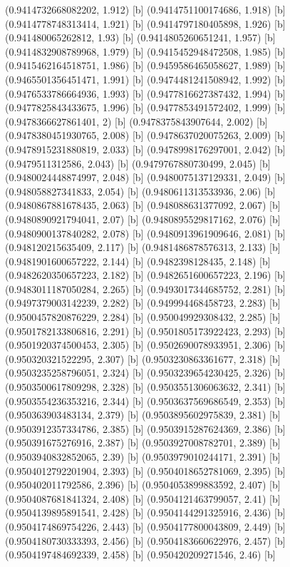 {{{(0.9414732668082202, 1.912) [b] 
(0.9414751100174686, 1.918) [b] 
(0.9414778748313414, 1.921) [b] 
(0.9414797180405898, 1.926) [b] 
(0.941480065262812, 1.93) [b] 
(0.9414805260651241, 1.957) [b] 
(0.9414832908789968, 1.979) [b] 
(0.9415452948472508, 1.985) [b] 
(0.9415462164518751, 1.986) [b] 
(0.9459586465058627, 1.989) [b] 
(0.9465501356451471, 1.991) [b] 
(0.9474481241508942, 1.992) [b] 
(0.9476533786664936, 1.993) [b] 
(0.9477816627387432, 1.994) [b] 
(0.9477825843433675, 1.996) [b] 
(0.9477853491572402, 1.999) [b] 
(0.9478366627861401, 2) [b] 
(0.9478375843907644, 2.002) [b] 
(0.9478380451930765, 2.008) [b] 
(0.9478637020075263, 2.009) [b] 
(0.9478915231880819, 2.033) [b] 
(0.9478998176297001, 2.042) [b] 
(0.9479511312586, 2.043) [b] 
(0.9479767880730499, 2.045) [b] 
(0.9480024448874997, 2.048) [b] 
(0.9480075137129331, 2.049) [b] 
(0.948058827341833, 2.054) [b] 
(0.9480611313533936, 2.06) [b] 
(0.9480867881678435, 2.063) [b] 
(0.948088631377092, 2.067) [b] 
(0.9480890921794041, 2.07) [b] 
(0.9480895529817162, 2.076) [b] 
(0.9480900137840282, 2.078) [b] 
(0.9480913961909646, 2.081) [b] 
(0.948120215635409, 2.117) [b] 
(0.9481486878576313, 2.133) [b] 
(0.9481901600657222, 2.144) [b] 
(0.9482398128435, 2.148) [b] 
(0.9482620350657223, 2.182) [b] 
(0.9482651600657223, 2.196) [b] 
(0.9483011187050284, 2.265) [b] 
(0.9493017344685752, 2.281) [b] 
(0.9497379003142239, 2.282) [b] 
(0.949994468458723, 2.283) [b] 
(0.9500457820876229, 2.284) [b] 
(0.950049929308432, 2.285) [b] 
(0.9501782133806816, 2.291) [b] 
(0.9501805173922423, 2.293) [b] 
(0.9501920374500453, 2.305) [b] 
(0.9502690078933951, 2.306) [b] 
(0.950320321522295, 2.307) [b] 
(0.9503230863361677, 2.318) [b] 
(0.9503235258796051, 2.324) [b] 
(0.9503239654230425, 2.326) [b] 
(0.9503500617809298, 2.328) [b] 
(0.9503551306063632, 2.341) [b] 
(0.9503554236353216, 2.344) [b] 
(0.9503637569686549, 2.353) [b] 
(0.950363903483134, 2.379) [b] 
(0.9503895602975839, 2.381) [b] 
(0.9503912357334786, 2.385) [b] 
(0.9503915287624369, 2.386) [b] 
(0.950391675276916, 2.387) [b] 
(0.9503927008782701, 2.389) [b] 
(0.9503940832852065, 2.39) [b] 
(0.9503979010244171, 2.391) [b] 
(0.9504012792201904, 2.393) [b] 
(0.9504018652781069, 2.395) [b] 
(0.950402011792586, 2.396) [b] 
(0.9504053899883592, 2.407) [b] 
(0.9504087681841324, 2.408) [b] 
(0.9504121463799057, 2.41) [b] 
(0.9504139895891541, 2.428) [b] 
(0.9504144291325916, 2.436) [b] 
(0.9504174869754226, 2.443) [b] 
(0.9504177800043809, 2.449) [b] 
(0.9504180730333393, 2.456) [b] 
(0.9504183660622976, 2.457) [b] 
(0.9504197484692339, 2.458) [b] 
(0.950420209271546, 2.46) [b] 
}}}
